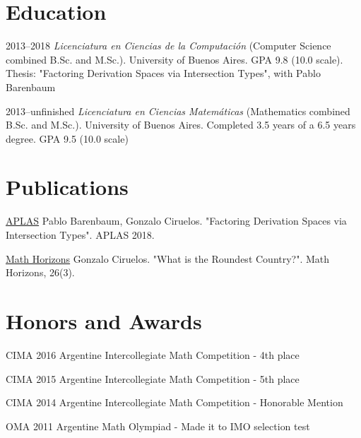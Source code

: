 \documentclass[a4paper,english,10pt]{article}
\begin{document}
\section{Education}
\begin{CV}
\item[2013--2018] \textit{Licenciatura en Ciencias de la Computación} (Computer Science combined B.Sc. and M.Sc.). University of Buenos Aires. GPA 9.8 (10.0 scale). Thesis: "Factoring Derivation Spaces via Intersection Types", with Pablo Barenbaum
\item[2013--unfinished] \textit{Licenciatura en Ciencias Matemáticas} (Mathematics combined B.Sc. and M.Sc.). University of Buenos Aires. Completed 3.5 years of a 6.5 years degree. GPA 9.5 (10.0 scale)
\end{CV}


\section{Publications}
\begin{CV}
\item[\href{https://doi.org/10.1007/978-3-030-02768-1_2}{APLAS}] Pablo Barenbaum, Gonzalo Ciruelos. "Factoring Derivation Spaces via Intersection Types". APLAS 2018.
\item[\href{https://doi.org/10.1080/10724117.2018.1524089}{Math Horizons}] Gonzalo Ciruelos. "What is the Roundest Country?".  Math Horizons, 26(3).
\end{CV}


\section{Honors and Awards}
\begin{CV}
\item [CIMA 2016] Argentine Intercollegiate Math Competition - 4th place
\item [CIMA 2015] Argentine Intercollegiate Math Competition - 5th place
\item [CIMA 2014] Argentine Intercollegiate Math Competition - Honorable Mention
\item [OMA 2011] Argentine Math Olympiad - Made it to IMO selection test
\end{CV}
\end{document}
